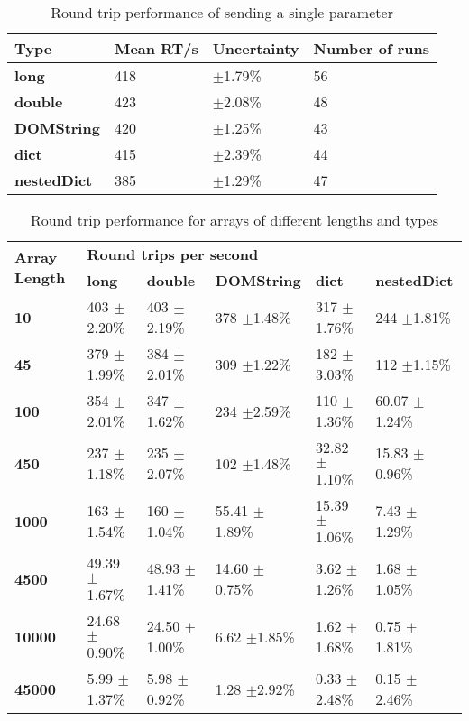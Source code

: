 \begin{table}[h]
\begin{tabular}{l|lll}
\textbf{Type}       & \textbf{Mean RT/s} & \textbf{Uncertainty} & \textbf{Number of runs} \\ \hline
\textbf{long}       & 418                & $\pm$1.79\%              & 56                      \\
\textbf{double}     & 423                & $\pm$2.08\%              & 48                      \\
\textbf{DOMString}  & 420                & $\pm$1.25\%              & 43                      \\
\textbf{dict}       & 415                & $\pm$2.39\%              & 44                      \\
\textbf{nestedDict} & 385                & $\pm$1.29\%              & 47                     
\end{tabular}
\caption{Round trip performance of sending a single parameter}
\label{table:roundtrip_single_param}
\end{table}


\begin{table}[h]
\begin{tabular}{l|lllll}
\multirow{2}{*}{\textbf{Array Length}} & \multicolumn{5}{l}{\textbf{Round trips per second}}                                        \\
                                       & \textbf{long} & \textbf{double} & \textbf{DOMString} & \textbf{dict} & \textbf{nestedDict} \\ \hline
\textbf{10}                            & 403 $\pm$2.20\%   & 403 $\pm$2.19\%     & 378 $\pm$1.48\%        & 317 $\pm$1.76\%   & 244 $\pm$1.81\%         \\
\textbf{45}                            & 379 $\pm$1.99\%   & 384 $\pm$2.01\%     & 309 $\pm$1.22\%        & 182 $\pm$3.03\%   & 112 $\pm$1.15\%         \\
\textbf{100}                           & 354 $\pm$2.01\%   & 347 $\pm$1.62\%     & 234 $\pm$2.59\%        & 110 $\pm$1.36\%   & 60.07 $\pm$1.24\%       \\
\textbf{450}                           & 237 $\pm$1.18\%   & 235 $\pm$2.07\%     & 102 $\pm$1.48\%        & 32.82 $\pm$1.10\% & 15.83 $\pm$0.96\%       \\
\textbf{1000}                          & 163 $\pm$1.54\%   & 160 $\pm$1.04\%     & 55.41 $\pm$1.89\%      & 15.39 $\pm$1.06\% & 7.43 $\pm$1.29\%        \\
\textbf{4500}                          & 49.39 $\pm$1.67\% & 48.93 $\pm$1.41\%   & 14.60 $\pm$0.75\%      & 3.62 $\pm$1.26\%  & 1.68 $\pm$1.05\%        \\
\textbf{10000}                         & 24.68 $\pm$0.90\% & 24.50 $\pm$1.00\%   & 6.62 $\pm$1.85\%       & 1.62 $\pm$1.68\%  & 0.75 $\pm$1.81\%        \\
\textbf{45000}                         & 5.99 $\pm$1.37\%  & 5.98 $\pm$0.92\%    & 1.28 $\pm$2.92\%       & 0.33 $\pm$2.48\%  & 0.15 $\pm$2.46\%       
\end{tabular}
\caption{Round trip performance for arrays of different lengths and types}
\label{table:roundtrip_array}
\end{table}

